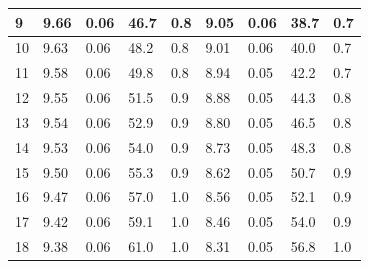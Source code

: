 \documentclass[12pt, a4paper]{article}
\begin{document}
\begin{table}[H]
\begin{center}
\begin{tabular}{|l|llll|llll|}
	9  & \multicolumn{1}{l|}{9.66}   & \multicolumn{1}{l|}{0.06}     & \multicolumn{1}{l|}{46.7}    & 0.8       & \multicolumn{1}{l|}{9.05}   & \multicolumn{1}{l|}{0.06}     & \multicolumn{1}{l|}{38.7}    & 0.7       \\ \hline
	10 & \multicolumn{1}{l|}{9.63}   & \multicolumn{1}{l|}{0.06}     & \multicolumn{1}{l|}{48.2}    & 0.8       & \multicolumn{1}{l|}{9.01}   & \multicolumn{1}{l|}{0.06}     & \multicolumn{1}{l|}{40.0}    & 0.7       \\ \hline
	11 & \multicolumn{1}{l|}{9.58}   & \multicolumn{1}{l|}{0.06}     & \multicolumn{1}{l|}{49.8}    & 0.8       & \multicolumn{1}{l|}{8.94}   & \multicolumn{1}{l|}{0.05}     & \multicolumn{1}{l|}{42.2}    & 0.7       \\ \hline
	12 & \multicolumn{1}{l|}{9.55}   & \multicolumn{1}{l|}{0.06}     & \multicolumn{1}{l|}{51.5}    & 0.9       & \multicolumn{1}{l|}{8.88}   & \multicolumn{1}{l|}{0.05}     & \multicolumn{1}{l|}{44.3}    & 0.8       \\ \hline
	13 & \multicolumn{1}{l|}{9.54}   & \multicolumn{1}{l|}{0.06}     & \multicolumn{1}{l|}{52.9}    & 0.9       & \multicolumn{1}{l|}{8.80}   & \multicolumn{1}{l|}{0.05}     & \multicolumn{1}{l|}{46.5}    & 0.8       \\ \hline
	14 & \multicolumn{1}{l|}{9.53}   & \multicolumn{1}{l|}{0.06}     & \multicolumn{1}{l|}{54.0}    & 0.9       & \multicolumn{1}{l|}{8.73}   & \multicolumn{1}{l|}{0.05}     & \multicolumn{1}{l|}{48.3}    & 0.8       \\ \hline
	15 & \multicolumn{1}{l|}{9.50}   & \multicolumn{1}{l|}{0.06}     & \multicolumn{1}{l|}{55.3}    & 0.9       & \multicolumn{1}{l|}{8.62}   & \multicolumn{1}{l|}{0.05}     & \multicolumn{1}{l|}{50.7}    & 0.9       \\ \hline
	16 & \multicolumn{1}{l|}{9.47}   & \multicolumn{1}{l|}{0.06}     & \multicolumn{1}{l|}{57.0}    & 1.0       & \multicolumn{1}{l|}{8.56}   & \multicolumn{1}{l|}{0.05}     & \multicolumn{1}{l|}{52.1}    & 0.9       \\ \hline
	17 & \multicolumn{1}{l|}{9.42}   & \multicolumn{1}{l|}{0.06}     & \multicolumn{1}{l|}{59.1}    & 1.0       & \multicolumn{1}{l|}{8.46}   & \multicolumn{1}{l|}{0.05}     & \multicolumn{1}{l|}{54.0}    & 0.9       \\ \hline
	18 & \multicolumn{1}{l|}{9.38}   & \multicolumn{1}{l|}{0.06}     & \multicolumn{1}{l|}{61.0}    & 1.0       & \multicolumn{1}{l|}{8.31}   & \multicolumn{1}{l|}{0.05}     & \multicolumn{1}{l|}{56.8}    & 1.0       \\ \hline

\end{tabular}
\end{center}
\end{table}
\end{document}

